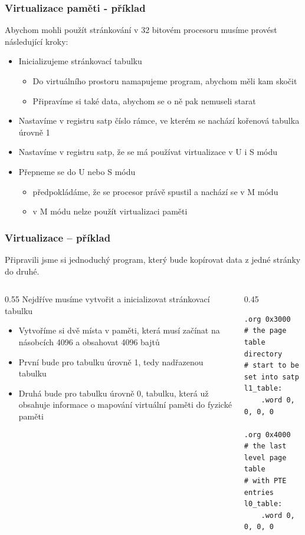 \documentclass[aspectratio=169]{beamer}
\begin{document}
\begin{frame}
\frametitle{Virtualizace paměti - příklad}

Abychom mohli použít stránkování v 32 bitovém procesoru musíme provést následující kroky:
\begin{itemize}
\item Inicializujeme stránkovací tabulku
\begin{itemize}
\item Do virtuálního prostoru namapujeme program, abychom měli kam skočit
\item Připravíme si také data, abychom se o ně pak nemuseli starat
\end{itemize}
\item Nastavíme v registru satp číslo rámce, ve kterém se nachází kořenová tabulka úrovně 1
\item Nastavíme v registru satp, že se má používat virtualizace v U i S módu
\item Přepneme se do U nebo S módu
\begin{itemize}
\item předpokládáme, že se procesor právě spustil a nachází se v M módu
\item v M módu nelze použít virtualizaci paměti
\end{itemize}
\end{itemize}

\end{frame}


\begin{frame}[fragile]
\frametitle{Virtualizace -- příklad}

Připravili jsme si jednoduchý program, který bude kopírovat data z jedné stránky do druhé.

\begin{columns}
\begin{column}{0.55\textwidth}
Nejdříve musíme vytvořit a inicializovat stránkovací tabulku
\begin{itemize}
\item Vytvoříme si dvě místa v paměti, která musí začínat na násobcích 4096 a obsahovat 4096 bajtů
\item První bude pro tabulku úrovně 1, tedy nadřazenou tabulku
\item Druhá bude pro tabulku úrovně 0, tabulku, která už obsahuje informace o mapování virtuální paměti do fyzické paměti
\end{itemize}
\end{column}
\hfill
\begin{column}{0.45\textwidth}
\begin{verbatim}
.org 0x3000
# the page table directory
# start to be set into satp
l1_table:
    .word 0, 0, 0, 0

.org 0x4000
# the last level page table
# with PTE entries
l0_table:
    .word 0, 0, 0, 0
\end{verbatim}
\end{column}
\end{columns}
\end{frame}
\end{document}
